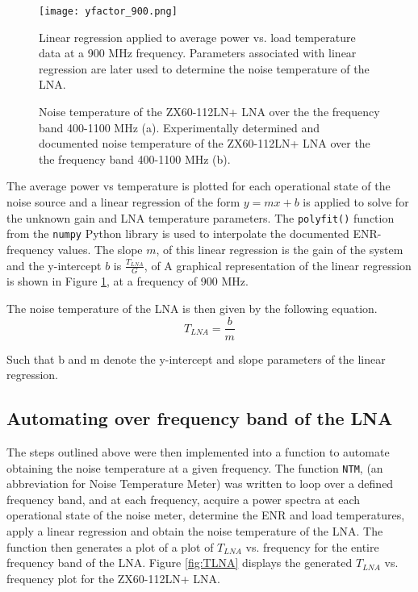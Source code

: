 \documentclass[twocolumn]{aastex631}
\begin{document}
\begin{figure}[h]
\texttt{[image: yfactor\_900.png]}
\caption{Linear regression applied to average power vs. load temperature data at a 900 MHz frequency. Parameters associated with linear regression are later used to determine the noise temperature of the LNA.}
\label{fig:ytest}
\end{figure}

\begin{figure*}[ht!]
\caption{ Noise temperature of the ZX60-112LN+ LNA over the the frequency band 400-1100 MHz (a). Experimentally determined and documented noise temperature of the ZX60-112LN+ LNA over the the frequency band 400-1100 MHz (b).
\label{fig:ex}}
\end{figure*}

The average power vs temperature is plotted for each operational state of the noise source and a linear regression of the form $y=mx+b$ is applied to solve for the unknown gain and LNA temperature parameters. The \texttt{polyfit()} function from the \texttt{numpy} Python library is used to interpolate the documented ENR-frequency values. The slope $m$, of this linear regression is the gain of the system and the y-intercept $b$ is $\frac{T_{LNA}}{G}$, of A graphical representation of the linear regression is shown in Figure \ref{fig:ytest}, at a frequency of 900 MHz. 

The noise temperature of the LNA is then given by the following equation.
\begin{equation}
    T_{LNA} = \frac{b}{m} 
\end{equation}
\begin{center}
    Such that b and m denote the y-intercept and slope parameters of the linear regression.
\end{center}

\subsection{Automating over frequency band of the LNA }
The steps outlined above were then implemented into a function to automate obtaining the noise temperature at a given frequency. The function \texttt{NTM}, (an abbreviation for Noise Temperature Meter) was written to loop over a defined frequency band, and at each frequency, acquire a power spectra at each operational state of the noise meter, determine the ENR and load temperatures, apply a linear regression and obtain the noise temperature of the LNA. The function then generates a plot of a plot of  $T_{LNA}$ vs. frequency for the entire frequency band of the LNA. Figure \ref{fig:TLNA} displays the generated  $T_{LNA}$ vs. frequency plot for the ZX60-112LN+ LNA.
\end{document}
